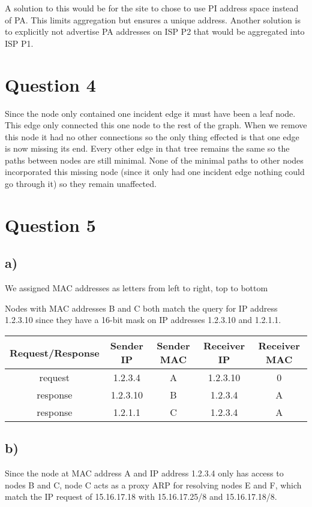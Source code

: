 \documentclass[12pt]{article}
\begin{document}
A solution to this would be for the site to chose to use PI address space instead of PA. This limits aggregation but ensures a unique address. Another solution is to explicitly not advertise PA addresses on ISP P2 that would be aggregated into ISP P1.


\section*{Question 4} %
\label{sec:question_4}
Since the node only contained one incident edge it must have been a leaf node. This edge only connected this one node to the rest of the graph. When we remove this node it had no other connections so the only thing effected is that one edge is now missing its end. Every other edge in that tree remains the same so the paths between nodes are still minimal. None of the minimal paths to other nodes incorporated this missing node (since it only had one incident edge nothing could go through it) so they remain unaffected.

\section*{Question 5} %
\label{sec:question_5}
\subsection*{a)} %
\label{sub:a_}
We assigned MAC addresses as letters from left to right, top to bottom

Nodes with MAC addresses B and C both match the query for IP address 1.2.3.10 since they have a 16-bit mask on IP addresses 1.2.3.10 and 1.2.1.1.

\begin{tabular}{|c|c|c|c|c|}
\hline
\textbf{Request/Response} & \textbf{Sender IP} & \textbf{Sender MAC} & \textbf{Receiver IP} & \textbf{Receiver MAC} \\ \hline
request & 1.2.3.4 & A & 1.2.3.10 & 0 \\
response & 1.2.3.10 & B & 1.2.3.4 & A \\
response & 1.2.1.1 & C & 1.2.3.4 & A \\
\hline
\end{tabular}



\subsection*{b)} %
\label{sub:b_}
\label{sub:a_}
Since the node at MAC address A and IP address 1.2.3.4 only has access to nodes B and C, node C acts as a proxy ARP for resolving nodes E and F, which match the IP request of 15.16.17.18 with 15.16.17.25/8 and 15.16.17.18/8.
\end{document}
